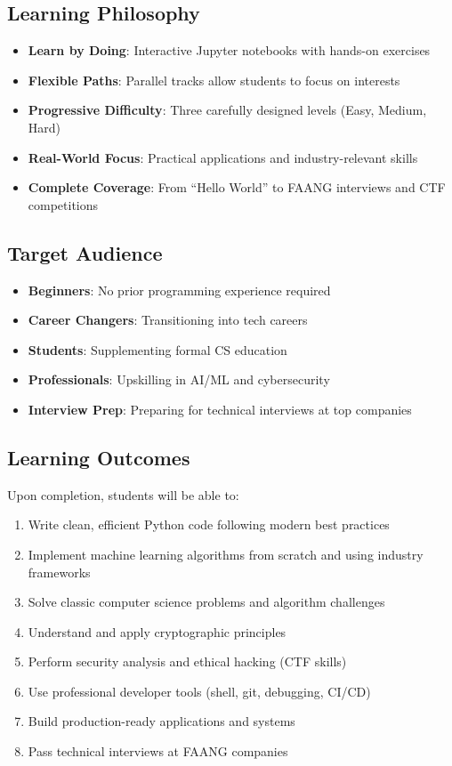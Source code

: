 \documentclass[11pt,letterpaper]{article}
\begin{document}
\subsection{Learning Philosophy}
\begin{itemize}[leftmargin=*]
    \item \textbf{Learn by Doing}: Interactive Jupyter notebooks with hands-on exercises
    \item \textbf{Flexible Paths}: Parallel tracks allow students to focus on interests
    \item \textbf{Progressive Difficulty}: Three carefully designed levels (Easy, Medium, Hard)
    \item \textbf{Real-World Focus}: Practical applications and industry-relevant skills
    \item \textbf{Complete Coverage}: From ``Hello World'' to FAANG interviews and CTF competitions
\end{itemize}

\subsection{Target Audience}
\begin{itemize}[leftmargin=*]
    \item \textbf{Beginners}: No prior programming experience required
    \item \textbf{Career Changers}: Transitioning into tech careers
    \item \textbf{Students}: Supplementing formal CS education
    \item \textbf{Professionals}: Upskilling in AI/ML and cybersecurity
    \item \textbf{Interview Prep}: Preparing for technical interviews at top companies
\end{itemize}

\subsection{Learning Outcomes}
Upon completion, students will be able to:
\begin{enumerate}[leftmargin=*]
    \item Write clean, efficient Python code following modern best practices
    \item Implement machine learning algorithms from scratch and using industry frameworks
    \item Solve classic computer science problems and algorithm challenges
    \item Understand and apply cryptographic principles
    \item Perform security analysis and ethical hacking (CTF skills)
    \item Use professional developer tools (shell, git, debugging, CI/CD)
    \item Build production-ready applications and systems
    \item Pass technical interviews at FAANG companies
\end{enumerate}
\end{document}
